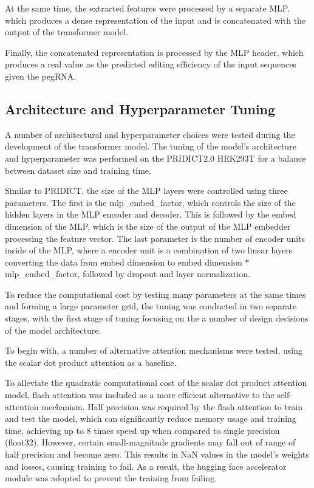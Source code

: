At the same time, the extracted features were processed by a separate MLP, which produces a dense representation of the input and is concatenated with the output of the transformer model. 

Finally, the concatenated representation is processed by the MLP header, which produces a real value as the predicted editing efficiency of the input sequences given the pegRNA.



\subsection{Architecture and Hyperparameter Tuning}

A number of architectural and hyperparameter choices were tested during the development of the transformer model.
The tuning of the model's architecture and hyperparameter was performed on the PRIDICT2.0 HEK293T for a balance between dataset size and training time.

Similar to PRIDICT, the size of the MLP layers were controlled using three parameters. The first is the mlp\_embed\_factor, which controls the size of the hidden layers in the MLP encoder and decoder. This is followed by the embed dimension of the MLP, which is the size of the output of the MLP embedder processing the feature vector. The last parameter is the number of encoder units inside of the MLP, where a encoder unit is a combination of two linear layers converting the data from embed dimension to embed dimension * mlp\_embed\_factor, followed by dropout and layer normalization.

To reduce the computational cost by testing many parameters at the same times and forming a large parameter grid, the tuning was conducted in two separate stages, with the first stage of tuning focusing on the a number of design decisions of the model architecture. 

To begin with, a number of alternative attention mechanisms were tested, using the scalar dot product attention as a baseline. 

To alleviate the quadratic computational cost of the scalar dot product attention model, flash attention was included as a more efficient alternative to the self-attention mechanism. Half precision was required by the flash attention to train and test the model, which can significantly reduce memory usage and training time, achieving up to 8 times speed up when compared to single precision (float32)\cite{micikeviciusMixedPrecisionTraining2018}. However, certain small-magnitude gradients may fall out of range of half precision and become zero. This results in NaN values in the model's weights and losses, causing training to fail. As a result, the hugging face accelerator module was adopted to prevent the training from failing. 

